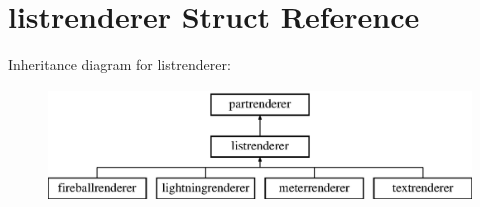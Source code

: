 \hypertarget{structlistrenderer}{}\section{listrenderer Struct Reference}
\label{structlistrenderer}
Inheritance diagram for listrenderer\+:\begin{figure}[H]
\begin{center}
\leavevmode
\includegraphics[height=3.000000cm]{structlistrenderer}
\end{center}
\end{figure}
